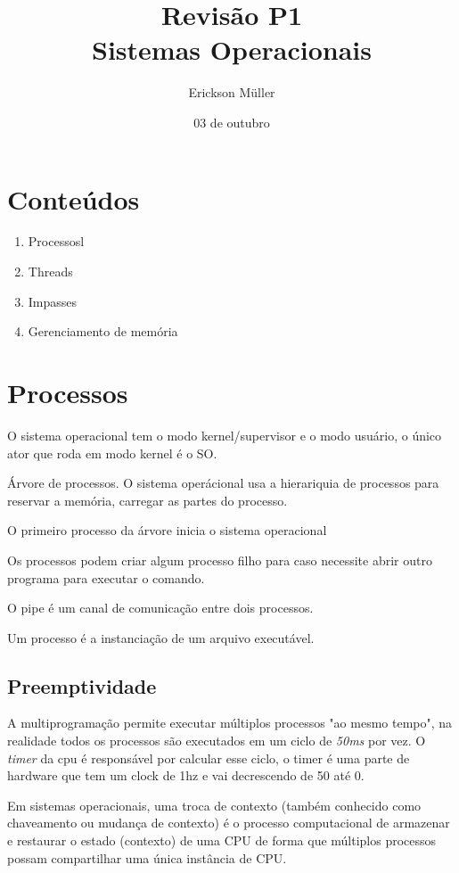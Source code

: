 \documentclass[ ]{article}
\title{Revisão P1\\Sistemas Operacionais}
\author{Erickson Müller}
\date{03 de outubro}
\begin{document}
	\maketitle
	\section*{Conteúdos}
		\begin{enumerate}
			\item Processosl
			\item Threads
			\item Impasses
			\item Gerenciamento de memória
		\end{enumerate}
	\newpage
	\section{Processos}
	
		O sistema operacional tem o modo kernel/supervisor e o modo usuário, o único ator que roda em modo kernel é o SO.
		
		Árvore de processos. O sistema operácional usa a hierariquia de processos para reservar a memória, carregar as partes do processo.
		
		O primeiro processo da árvore inicia o sistema operacional
		
		Os processos podem criar algum processo filho para caso necessite abrir outro programa para executar o comando.
		
		O pipe é um canal de comunicação entre dois processos.
		
		Um processo é a instanciação de um arquivo executável.
		\subsection{Preemptividade}
			A multiprogramação permite executar múltiplos processos "ao mesmo tempo", na realidade todos os processos são executados em um ciclo de \textit{50ms} por vez. O \textit{timer} da cpu é responsável por calcular esse ciclo, o timer é uma parte de hardware que tem um clock de 1hz e vai decrescendo de 50 até 0.
			
			Em sistemas operacionais, uma troca de contexto (também conhecido como chaveamento ou mudança de contexto) é o processo computacional de armazenar e restaurar o estado (contexto) de uma CPU de forma que múltiplos processos possam compartilhar uma única instância de CPU.
			
\end{document}

